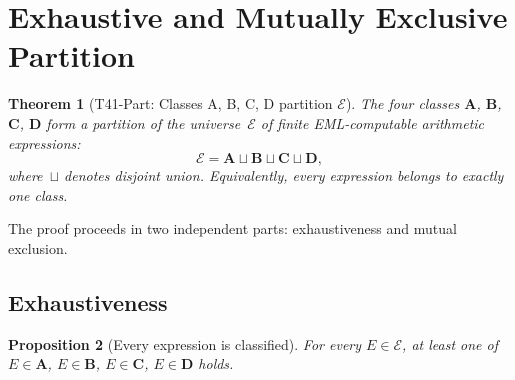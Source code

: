 \documentclass[12pt,a4paper]{article}
\newtheorem{theorem}{Theorem}[section]
\newtheorem{proposition}[theorem]{Proposition}
\theoremstyle{definition}
\begin{document}
\section{Exhaustive and Mutually Exclusive Partition}
\label{sec:partition}

\begin{theorem}[T41-Part: Classes A, B, C, D partition $\mathcal{E}$]
\label{thm:partition}
The four classes $\mathbf{A}$, $\mathbf{B}$, $\mathbf{C}$, $\mathbf{D}$
form a partition of the universe~$\mathcal{E}$ of finite
EML-computable arithmetic expressions:
\[
  \mathcal{E} = \mathbf{A} \sqcup \mathbf{B} \sqcup \mathbf{C}
              \sqcup \mathbf{D},
\]
where~$\sqcup$ denotes disjoint union.
Equivalently, every expression belongs to exactly one class.
\end{theorem}

The proof proceeds in two independent parts: exhaustiveness and mutual
exclusion.

\subsection{Exhaustiveness}

\begin{proposition}[Every expression is classified]
\label{prop:exhaust}
For every $E \in \mathcal{E}$, at least one of
$E \in \mathbf{A}$, $E \in \mathbf{B}$, $E \in \mathbf{C}$,
$E \in \mathbf{D}$ holds.
\end{proposition}
\end{document}
